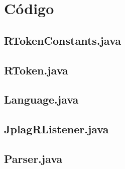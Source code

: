 \chapter{Código}

\section{RTokenConstants.java}


\section{RToken.java}



\section{Language.java}


\section{JplagRListener.java}


\section{Parser.java}














